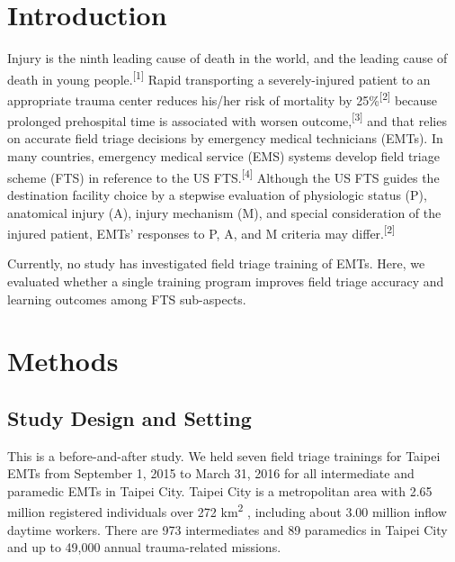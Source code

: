 \documentclass[
  20pt
]{article}
\begin{document}
\begin{multicols}{2}
\hypertarget{introduction}{%
\section{Introduction}\label{introduction}}

{Injury is the ninth leading cause of death in the world, and the leading
cause of death in young people.\textsuperscript{{[}1{]}} Rapid
transporting a severely-injured patient to an appropriate trauma center
reduces his/her risk of mortality by 25\%\textsuperscript{{[}2{]}}
because prolonged prehospital time is associated with worsen
outcome,\textsuperscript{{[}3{]}} and that relies on accurate field
triage decisions by emergency medical technicians (EMTs). In many
countries, emergency medical service (EMS) systems develop field triage
scheme (FTS) in reference to the US FTS.\textsuperscript{{[}4{]}}
Although the US FTS guides the destination facility choice by a stepwise
evaluation of physiologic status (P), anatomical injury (A), injury
mechanism (M), and special consideration of the injured patient, EMTs'
responses to P, A, and M criteria may differ.\textsuperscript{{[}2{]}}

Currently, no study has investigated field triage training of EMTs.
Here, we evaluated whether a single training program improves field
triage accuracy and learning outcomes among FTS sub-aspects.}

\hypertarget{methods}{%
\section{Methods}\label{methods}}

\hypertarget{study-design-and-setting}{%
\subsection{Study Design and Setting}\label{study-design-and-setting}}

This is a before-and-after study. We held seven field triage trainings
for Taipei EMTs from September 1, 2015 to March 31, 2016 for all
intermediate and paramedic EMTs in Taipei City. Taipei City is a
metropolitan area with 2.65 million registered individuals over 272
km\textsuperscript{2} , including about 3.00 million inflow daytime
workers. There are 973 intermediates and 89 paramedics in Taipei City
and up to 49,000 annual trauma-related missions.

\hypertarget{irb-approval}{%
}
\end{multicols}
\end{document}
